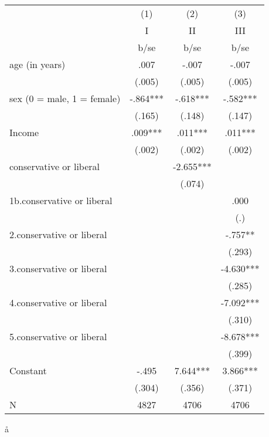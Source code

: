 \documentclass[11pt]{article}
\begin{document}
    {
    \def\sym#1{\ifmmode^{#1}\else\(^{#1}\)\fi}
    \begin{tabular}{l*{3}{c}}
    \hline\hline
     &\multicolumn{1}{c}{(1)}&\multicolumn{1}{c}{(2)}&\multicolumn{1}{c}{(3)}\\
     &\multicolumn{1}{c}{I}&\multicolumn{1}{c}{II}&\multicolumn{1}{c}{III}\\
     & b/se & b/se & b/se \\
    \hline
    age (in years) & .007 & -.007 & -.007 \\
     & (.005) & (.005) & (.005) \\
    sex (0 = male, 1 = female) & -.864***& -.618***& -.582***\\
     & (.165) & (.148) & (.147) \\
    Income & .009***& .011***& .011***\\
     & (.002) & (.002) & (.002) \\
    conservative or liberal & & -2.655***& \\
     & & (.074) & \\
    1b.conservative or liberal & & & .000 \\
     & & & (.) \\
    2.conservative or liberal & & & -.757** \\
     & & & (.293) \\
    3.conservative or liberal & & & -4.630***\\
     & & & (.285) \\
    4.conservative or liberal & & & -7.092***\\
     & & & (.310) \\
    5.conservative or liberal & & & -8.678***\\
     & & & (.399) \\
    Constant & -.495 & 7.644***& 3.866***\\
     & (.304) & (.356) & (.371) \\
    \hline
    N & 4827 & 4706 & 4706 \\
    \hline\hline
    \end{tabular}
    }å
\end{document}
